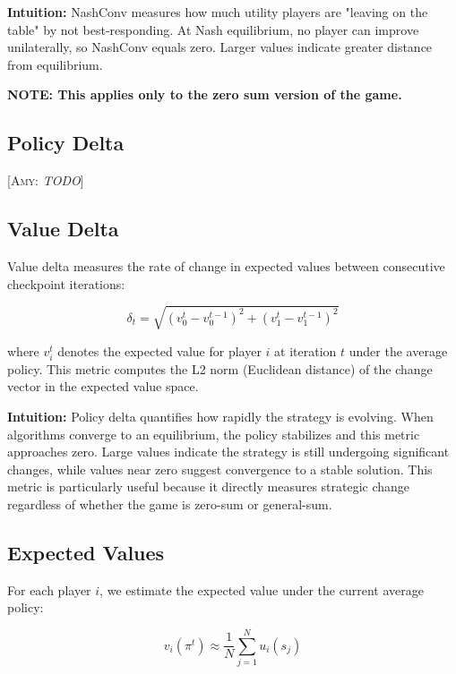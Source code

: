 \documentclass[11pt]{article}
\newcommand{\amy}[1]{{\color{red}[\textsc{Amy}: \emph{#1}]}}
\begin{document}
\textbf{Intuition:} NashConv measures how much utility players are "leaving on the table" by not best-responding. At Nash equilibrium, no player can improve unilaterally, so NashConv equals zero. Larger values indicate greater distance from equilibrium.

\textbf{NOTE: This applies only to the zero sum version of the game.}






\subsection{Policy Delta}

\amy{TODO}



\subsection{Value Delta}

Value delta measures the rate of change in expected values between consecutive checkpoint iterations:

\begin{equation}
\delta_t = \sqrt{(v_0^t - v_0^{t-1})^2 + (v_1^t - v_1^{t-1})^2}
\end{equation}

where $v_i^t$ denotes the expected value for player $i$ at iteration $t$ under the average policy. This metric computes the L2 norm (Euclidean distance) of the change vector in the expected value space.

\textbf{Intuition:} Policy delta quantifies how rapidly the strategy is evolving. When algorithms converge to an equilibrium, the policy stabilizes and this metric approaches zero. Large values indicate the strategy is still undergoing significant changes, while values near zero suggest convergence to a stable solution. This metric is particularly useful because it directly measures strategic change regardless of whether the game is zero-sum or general-sum.

\subsection{Expected Values}

For each player $i$, we estimate the expected value under the current average policy:

\begin{equation}
v_i(\pi^t) \approx \frac{1}{N} \sum_{j=1}^{N} u_i(s_j)
\end{equation}
\end{document}
